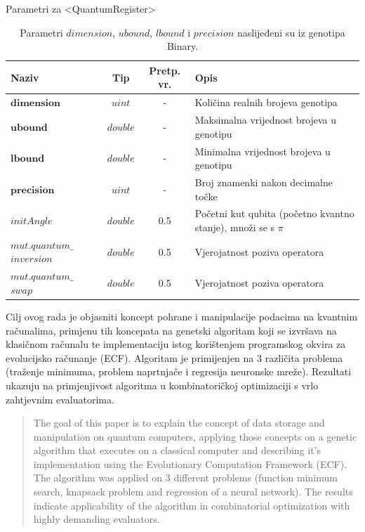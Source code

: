\documentclass[times, utf8, zavrsni, numeric]{fer}
\begin{document}
\begin{table}[htb]
\caption{Parametri za <QuantumRegister>}
\label{tbl:param_kvareg}
\centering
\caption*{\footnotesize Parametri $dimension$, $ubound$, $lbound$ i $precision$ naslijeđeni su iz genotipa Binary.}
\begin{tabular}{p{3cm}ccp{7cm}} \hline
Naziv & Tip & Pretp. vr. & Opis\\ \toprule
$\textbf{dimension}$ & $uint$ & - & Količina realnih brojeva genotipa \\
$\textbf{ubound}$ & $double$ & - & Maksimalna vrijednost brojeva u genotipu \\
$\textbf{lbound}$ & $double$ & - & Minimalna vrijednost brojeva u genotipu \\
$\textbf{precision}$ & $uint$ & - & Broj znamenki nakon decimalne točke \\
$initAngle$ & $double$ & 0.5 & Početni kut qubita (početno kvantno stanje), množi se s $\pi$ \\
$mut.quantum\_$ $inversion$ & $double$ & 0.5 & Vjerojatnost poziva operatora \\
$mut.quantum\_$ $swap$ & $double$ & 0.5 & Vjerojatnost poziva operatora \\ \bottomrule
\end{tabular}
\end{table}

\clearpage

\begin{sazetak}
Cilj ovog rada je objasniti koncept pohrane i manipulacije podacima na kvantnim računalima, primjenu tih koncepata na genetski algoritam koji se izvršava na klasičnom računalu te implementaciju istog korištenjem programskog okvira za evolucijsko računanje (ECF). Algoritam je primijenjen na 3 različita problema (traženje minimuma, problem naprtnjače i regresija neuronske mreže). Rezultati ukazuju na primjenjivost algoritma u kombinatoričkoj optimizaciji s vrlo zahtjevnim evaluatorima.

\end{sazetak}

\begin{abstract}
The goal of this paper is to explain the concept of data storage and manipulation on quantum computers, applying those concepts on a genetic algorithm that executes on a classical computer and describing it's implementation using the Evolutionary Computation Framework (ECF). The algorithm was applied on 3 different problems (function minimum search, knapsack problem and regression of a neural network). The results indicate applicability of the algorithm in combinatorial optimization with highly demanding evaluators.

\end{abstract}
\end{document}
